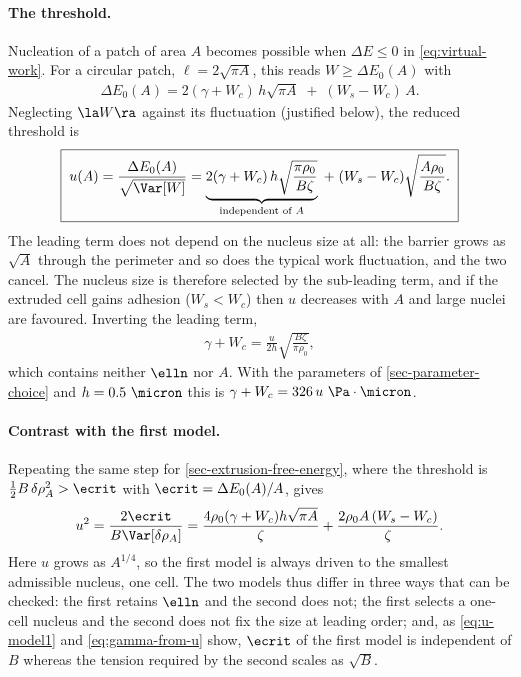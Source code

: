 \paragraph{The threshold.} Nucleation of a patch of area $A$ becomes possible when $\Delta E\le0$ in \eqref{eq:virtual-work}. For a circular patch, $\ell = 2\sqrt{\pi A}$, this reads $W \ge \Delta E_0(A)$ with
\begin{align}
    \label{eq:barrier-of-A}
    \Delta E_0(A) = 2(\gamma+W_c)\,h\sqrt{\pi A} \;+\; (W_s-W_c)\,A .
\end{align}
Neglecting $\la W\ra$ against its fluctuation (justified below), the reduced threshold is
\begin{align}
    \label{eq:u-model2}
    \boxed{\;
    u(A) = \frac{\Delta E_0(A)}{\sqrt{\Var[W]}}
    = \underbrace{2(\gamma+W_c)\,h\sqrt{\frac{\pi\rho_0}{B\zeta}}}_{\text{independent of }A}
    \;+\;(W_s-W_c)\sqrt{\frac{A\rho_0}{B\zeta}} .
    \;}
\end{align}
The leading term does not depend on the nucleus size at all: the barrier grows as $\sqrt A$ through the perimeter and so does the typical work fluctuation, and the two cancel. The nucleus size is therefore selected by the sub-leading term, and if the extruded cell gains adhesion ($W_s<W_c$) then $u$ decreases with $A$ and large nuclei are favoured. Inverting the leading term,
\begin{align}
    \label{eq:gamma-from-u}
    \gamma + W_c = \frac{u}{2h}\sqrt{\frac{B\zeta}{\pi\rho_0}} ,
\end{align}
which contains neither $\elln$ nor $A$. With the parameters of \cref{sec-parameter-choice} and $h = 0.5~\micron$ this is $\gamma+W_c = 326\,u~\Pa\cdot\micron$.

\paragraph{Contrast with the first model.} Repeating the same step for \cref{sec-extrusion-free-energy}, where the threshold is $\tfrac12B\,\delta\rho_A^2 > \ecrit$ with $\ecrit = \Delta E_0(A)/A$, gives
\begin{align}
    \label{eq:u-model1}
    u^2 = \frac{2\ecrit}{B\Var[\delta\rho_A]}
    = \frac{4\rho_0(\gamma+W_c)h\sqrt{\pi A}}{\zeta} + \frac{2\rho_0 A\,(W_s-W_c)}{\zeta} .
\end{align}
Here $u$ grows as $A^{1/4}$, so the first model is always driven to the smallest admissible nucleus, one cell. The two models thus differ in three ways that can be checked: the first retains $\elln$ and the second does not; the first selects a one-cell nucleus and the second does not fix the size at leading order; and, as \eqref{eq:u-model1} and \eqref{eq:gamma-from-u} show, $\ecrit$ of the first model is independent of $B$ whereas the tension required by the second scales as $\sqrt B$.
